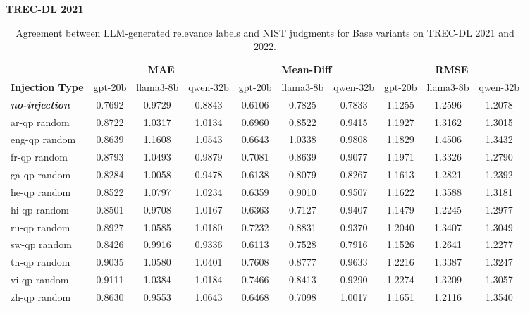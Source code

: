 \begin{table}[t]
\centering
\caption{Agreement between LLM-generated relevance labels and NIST judgments for Base variants on TREC-DL 2021 and 2022.}
\label{tab:metrics_base}
\setlength{\tabcolsep}{3.5pt}
\footnotesize
\textbf{TREC-DL 2021} \\
\vspace{0.2em}
\begin{tabular}{lccccccccc}
\toprule
 & \multicolumn{3}{c}{\textbf{MAE}} & \multicolumn{3}{c}{\textbf{Mean-Diff}} & \multicolumn{3}{c}{\textbf{RMSE}} \\
\cmidrule(lr){2-4} \cmidrule(lr){5-7} \cmidrule(lr){8-10}
\textbf{Injection Type} & gpt-20b & llama3-8b & qwen-32b & gpt-20b & llama3-8b & qwen-32b & gpt-20b & llama3-8b & qwen-32b \\
\midrule
\textbf{\textit{no-injection}} & 0.7692 & 0.9729 & 0.8843 & 0.6106 & 0.7825 & 0.7833 & 1.1255 & 1.2596 & 1.2078 \\
ar-qp random & 0.8722 & 1.0317 & 1.0134 & 0.6960 & 0.8522 & 0.9415 & 1.1927 & 1.3162 & 1.3015 \\
eng-qp random & 0.8639 & 1.1608 & 1.0543 & 0.6643 & 1.0338 & 0.9808 & 1.1829 & 1.4506 & 1.3432 \\
fr-qp random & 0.8793 & 1.0493 & 0.9879 & 0.7081 & 0.8639 & 0.9077 & 1.1971 & 1.3326 & 1.2790 \\
ga-qp random & 0.8284 & 1.0058 & 0.9478 & 0.6138 & 0.8079 & 0.8267 & 1.1613 & 1.2821 & 1.2392 \\
he-qp random & 0.8522 & 1.0797 & 1.0234 & 0.6359 & 0.9010 & 0.9507 & 1.1622 & 1.3588 & 1.3181 \\
hi-qp random & 0.8501 & 0.9708 & 1.0167 & 0.6363 & 0.7127 & 0.9407 & 1.1479 & 1.2245 & 1.2977 \\
ru-qp random & 0.8927 & 1.0585 & 1.0180 & 0.7232 & 0.8831 & 0.9370 & 1.2040 & 1.3407 & 1.3049 \\
sw-qp random & 0.8426 & 0.9916 & 0.9336 & 0.6113 & 0.7528 & 0.7916 & 1.1526 & 1.2641 & 1.2277 \\
th-qp random & 0.9035 & 1.0580 & 1.0401 & 0.7608 & 0.8777 & 0.9633 & 1.2216 & 1.3387 & 1.3247 \\
vi-qp random & 0.9111 & 1.0384 & 1.0184 & 0.7466 & 0.8413 & 0.9290 & 1.2274 & 1.3209 & 1.3057 \\
zh-qp random & 0.8630 & 0.9553 & 1.0643 & 0.6468 & 0.7098 & 1.0017 & 1.1651 & 1.2116 & 1.3540 \\
\bottomrule
\end{tabular}
\vspace{2em}


\end{table}
